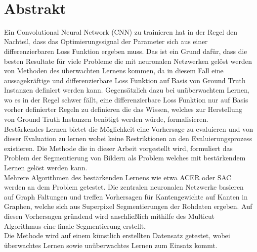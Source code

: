 ~\label{sec:ref}
\section*{Abstrakt}
Ein Convolutional Neural Network (CNN) zu trainieren hat in der Regel den Nachteil, dass das Optimierungssignal der Parameter sich aus einer differenzierbaren Loss Funktion ergeben muss. Das ist ein Grund dafür, dass die besten Resultate für viele Probleme die mit neuronalen Netzwerken gelöst werden von Methoden des überwachten Lernens kommen, da in diesem Fall eine aussagekräftige und differenzierbare Loss Funktion auf Basis von Ground Truth Instanzen definiert werden kann. Gegensätzlich dazu bei unüberwachtem Lernen, wo es in der Regel schwer fällt, eine differenzierbare Loss Funktion nur auf Basis vorher definierter Regeln zu definieren die das Wissen, welches zur Herstellung von Ground Truth Instanzen benötigt werden würde, formalisieren.\\
Bestärkendes Lernen bietet die Möglichkeit eine Vorhersage zu evaluieren und von dieser Evaluation zu lernen wobei keine Restriktionen an den Evaluierungsprozess existieren. Die Methode die in dieser Arbeit vorgestellt wird, formuliert das Problem der Segmentierung von Bildern als Problem welches mit bestärkendem Lernen gelöst werden kann.\\
Mehrere Algorithmen des bestärkenden Lernens wie etwa ACER \cite{wang2016sample} oder SAC \cite{haarnoja2018soft} werden an dem Problem getestet. Die zentralen neuronalen Netzwerke basieren auf Graph Faltungen und treffen Vorhersagen für Kantengewichte auf Kanten in Graphen, welche sich aus Superpixel Segmentierungen der Rohdaten ergeben. Auf diesen Vorhersagen gründend wird anschließlich mithilfe des Multicut Algorithmus eine finale Segmentierung erstellt.\\
Die Methode wird auf einem künstlich erstellten Datensatz getestet, wobei überwachtes Lernen sowie unüberwachtes Lernen zum Einsatz kommt.
